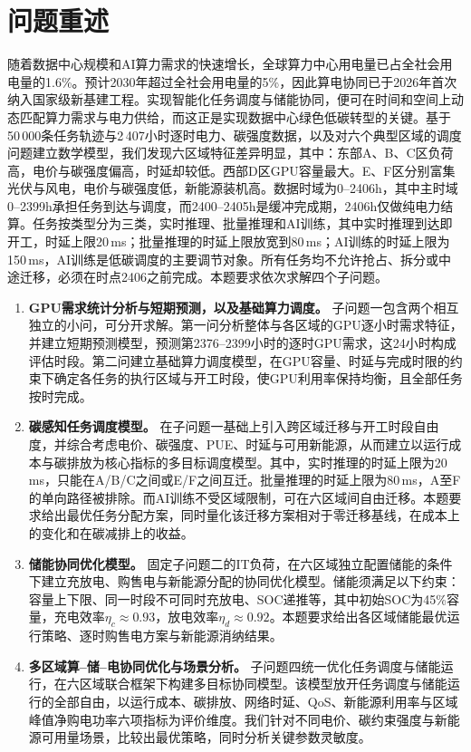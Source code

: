 \section{问题重述}

随着数据中心规模和AI算力需求的快速增长，全球算力中心用电量已占全社会用电量的1.6\%。预计2030年超过全社会用电量的5\%，因此算电协同已于2026年首次纳入国家级新基建工程。实现智能化任务调度与储能协同，便可在时间和空间上动态匹配算力需求与电力供给，而这正是实现数据中心绿色低碳转型的关键。基于50\,000条任务轨迹与2\,407小时逐时电力、碳强度数据，以及对六个典型区域的调度问题建立数学模型，我们发现六区域特征差异明显，其中：东部A、B、C区负荷高，电价与碳强度偏高，时延却较低。西部D区GPU容量最大。E、F区分别富集光伏与风电，电价与碳强度低，新能源装机高。数据时域为0--2406h，其中主时域0--2399h承担任务到达与调度，而2400--2405h是缓冲完成期，2406h仅做纯电力结算。任务按类型分为三类，实时推理、批量推理和AI训练，其中实时推理到达即开工，时延上限20\,ms；批量推理的时延上限放宽到80\,ms；AI训练的时延上限为150\,ms，AI训练是低碳调度的主要调节对象。所有任务均不允许抢占、拆分或中途迁移，必须在时点2406之前完成。本题要求依次求解四个子问题。

\begin{enumerate}
    \item \textbf{GPU需求统计分析与短期预测，以及基础算力调度。} 子问题一包含两个相互独立的小问，可分开求解。第一问分析整体与各区域的GPU逐小时需求特征，并建立短期预测模型，预测第2376--2399小时的逐时GPU需求，这24小时构成评估时段。第二问建立基础算力调度模型，在GPU容量、时延与完成时限的约束下确定各任务的执行区域与开工时段，使GPU利用率保持均衡，且全部任务按时完成。

    \item \textbf{碳感知任务调度模型。} 在子问题一基础上引入跨区域迁移与开工时段自由度，并综合考虑电价、碳强度、PUE、时延与可用新能源，从而建立以运行成本与碳排放为核心指标的多目标调度模型。其中，实时推理的时延上限为20\,ms，只能在A/B/C之间或E/F之间互迁。批量推理的时延上限为80\,ms，A至F的单向路径被排除。而AI训练不受区域限制，可在六区域间自由迁移。本题要求给出最优任务分配方案，同时量化该迁移方案相对于零迁移基线，在成本上的变化和在碳减排上的收益。

    \item \textbf{储能协同优化模型。} 固定子问题二的IT负荷，在六区域独立配置储能的条件下建立充放电、购售电与新能源分配的协同优化模型。储能须满足以下约束：容量上下限、同一时段不可同时充放电、SOC递推等，其中初始SOC为45\%容量，充电效率$\eta_c\approx0.93$，放电效率$\eta_d\approx0.92$。本题要求给出各区域储能最优运行策略、逐时购售电方案与新能源消纳结果。

    \item \textbf{多区域算--储--电协同优化与场景分析。} 子问题四统一优化任务调度与储能运行，在六区域联合框架下构建多目标协同模型。该模型放开任务调度与储能运行的全部自由，以运行成本、碳排放、网络时延、QoS、新能源利用率与区域峰值净购电功率六项指标为评价维度。我们针对不同电价、碳约束强度与新能源可用量场景，比较出最优策略，同时分析关键参数灵敏度。
\end{enumerate}
